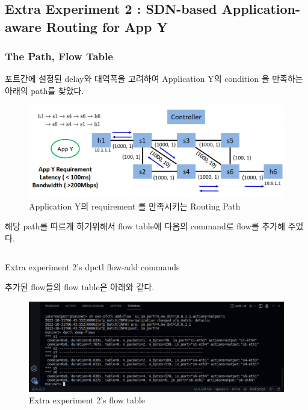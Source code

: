             \vspace{-5mm}
    \subsection*{Extra Experiment 2 : SDN-based Application-aware Routing for App Y}
        \subsubsection*{The Path, Flow Table}
            포트간에 설정된 delay와 대역폭을 고려하여 Application Y의 condition 을 만족하는 아래의 path를 찾았다.\\
                \vspace{-4mm}
            \begin{figure}[!h]\centering 
            	\includegraphics[width=.7\textwidth]{image/week08/e2-0.png}
            	\caption{\footnotesize
            	 Application Y의 requirement 를 만족시키는  Routing Path}
            	\vspace{-10pt}
            \end{figure}
            
            해당 path를 따르게 하기위해서 flow table에 다음의 command로 flow를 추가해 주었다.
            \begin{listing}[h!]
            \inputminted[framerule = 1pt,framesep = 2mm , frame = lines, fontsize=\footnotesize]{python}{./code/week08/flow-e2.sh}
            \vspace{-4mm}
            \caption{\footnotesize Extra experiment 2's dpctl flow-add commands}
            \end{listing}
            
            \vspace{-2mm}
            추가된 flow들의 flow table은 아래와 같다.\\
                \vspace{-4mm}
            \begin{figure}[!h]\centering 
            	\includegraphics[width=.99\textwidth]{image/week08/e2-1.png}
            	\caption{\footnotesize
            	 Extra experiment 2's flow table}
            	\vspace{-10pt}
            \end{figure}
